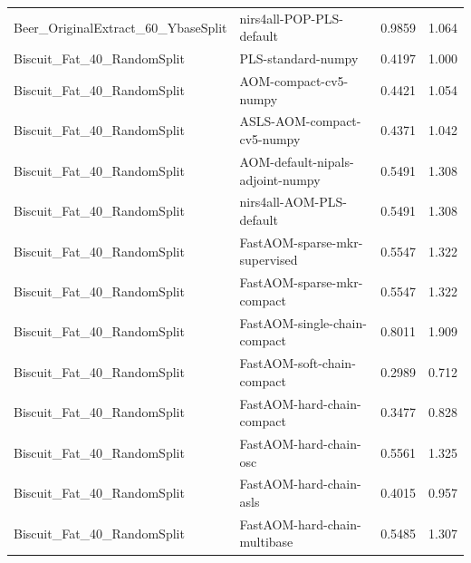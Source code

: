 \begin{landscape}
\begin{longtable}{L{8.0cm}L{9.5cm}rr}
Beer\_\allowbreak{}OriginalExtract\_\allowbreak{}60\_\allowbreak{}YbaseSplit & nirs4all-\allowbreak{}POP-\allowbreak{}PLS-\allowbreak{}default & 0.9859 & 1.064 \\
Biscuit\_\allowbreak{}Fat\_\allowbreak{}40\_\allowbreak{}RandomSplit & PLS-\allowbreak{}standard-\allowbreak{}numpy & 0.4197 & 1.000 \\
Biscuit\_\allowbreak{}Fat\_\allowbreak{}40\_\allowbreak{}RandomSplit & AOM-\allowbreak{}compact-\allowbreak{}cv5-\allowbreak{}numpy & 0.4421 & 1.054 \\
Biscuit\_\allowbreak{}Fat\_\allowbreak{}40\_\allowbreak{}RandomSplit & ASLS-\allowbreak{}AOM-\allowbreak{}compact-\allowbreak{}cv5-\allowbreak{}numpy & 0.4371 & 1.042 \\
Biscuit\_\allowbreak{}Fat\_\allowbreak{}40\_\allowbreak{}RandomSplit & AOM-\allowbreak{}default-\allowbreak{}nipals-\allowbreak{}adjoint-\allowbreak{}numpy & 0.5491 & 1.308 \\
Biscuit\_\allowbreak{}Fat\_\allowbreak{}40\_\allowbreak{}RandomSplit & nirs4all-\allowbreak{}AOM-\allowbreak{}PLS-\allowbreak{}default & 0.5491 & 1.308 \\
Biscuit\_\allowbreak{}Fat\_\allowbreak{}40\_\allowbreak{}RandomSplit & FastAOM-\allowbreak{}sparse-\allowbreak{}mkr-\allowbreak{}supervised & 0.5547 & 1.322 \\
Biscuit\_\allowbreak{}Fat\_\allowbreak{}40\_\allowbreak{}RandomSplit & FastAOM-\allowbreak{}sparse-\allowbreak{}mkr-\allowbreak{}compact & 0.5547 & 1.322 \\
Biscuit\_\allowbreak{}Fat\_\allowbreak{}40\_\allowbreak{}RandomSplit & FastAOM-\allowbreak{}single-\allowbreak{}chain-\allowbreak{}compact & 0.8011 & 1.909 \\
Biscuit\_\allowbreak{}Fat\_\allowbreak{}40\_\allowbreak{}RandomSplit & FastAOM-\allowbreak{}soft-\allowbreak{}chain-\allowbreak{}compact & 0.2989 & 0.712 \\
Biscuit\_\allowbreak{}Fat\_\allowbreak{}40\_\allowbreak{}RandomSplit & FastAOM-\allowbreak{}hard-\allowbreak{}chain-\allowbreak{}compact & 0.3477 & 0.828 \\
Biscuit\_\allowbreak{}Fat\_\allowbreak{}40\_\allowbreak{}RandomSplit & FastAOM-\allowbreak{}hard-\allowbreak{}chain-\allowbreak{}osc & 0.5561 & 1.325 \\
Biscuit\_\allowbreak{}Fat\_\allowbreak{}40\_\allowbreak{}RandomSplit & FastAOM-\allowbreak{}hard-\allowbreak{}chain-\allowbreak{}asls & 0.4015 & 0.957 \\
Biscuit\_\allowbreak{}Fat\_\allowbreak{}40\_\allowbreak{}RandomSplit & FastAOM-\allowbreak{}hard-\allowbreak{}chain-\allowbreak{}multibase & 0.5485 & 1.307 \\

\end{longtable}
\end{landscape}
